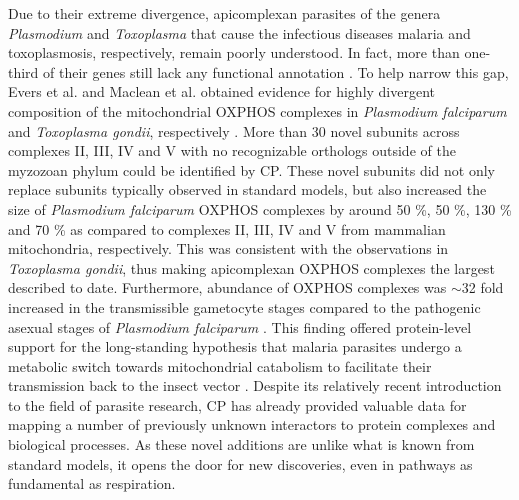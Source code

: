 Due to their extreme divergence, apicomplexan parasites of the genera \emph{Plasmodium} and \emph{Toxoplasma} that cause the infectious diseases malaria and toxoplasmosis, respectively, remain poorly understood. In fact, more than one-third of their genes still lack any functional annotation \cite{Aurrecoechea_2009, Harb_2020}. To help narrow this gap, Evers et al. and Maclean et al. obtained evidence for highly divergent composition of the mitochondrial OXPHOS complexes in \emph{Plasmodium falciparum} and \emph{Toxoplasma gondii}, respectively \cite{Evers_2021, Maclean_2021}. More than 30 novel subunits across complexes II, III, IV and V with no recognizable orthologs outside of the myzozoan phylum could be identified by CP. These novel subunits did not only replace subunits typically observed in standard models, but also increased the size of \emph{Plasmodium falciparum} OXPHOS complexes by around 50 \%, 50 \%, 130 \% and 70 \% as compared to complexes II, III, IV and V from mammalian mitochondria, respectively. This was consistent with the observations in \emph{Toxoplasma gondii}, thus making apicomplexan OXPHOS complexes the largest described to date. Furthermore, abundance of OXPHOS complexes was $\sim$32 fold increased in the transmissible gametocyte stages compared to the pathogenic asexual stages of \emph{Plasmodium falciparum} \cite{Evers_2021}. This finding offered protein-level support for the long-standing hypothesis that malaria parasites undergo a metabolic switch towards mitochondrial catabolism to facilitate their transmission back to the insect vector \cite{MacRae_2013}. Despite its relatively recent introduction to the field of parasite research, CP has already provided valuable data for mapping a number of previously unknown interactors to protein complexes and biological processes. As these novel additions are unlike what is known from standard models, it opens the door for new discoveries, even in pathways as fundamental as respiration.
%
